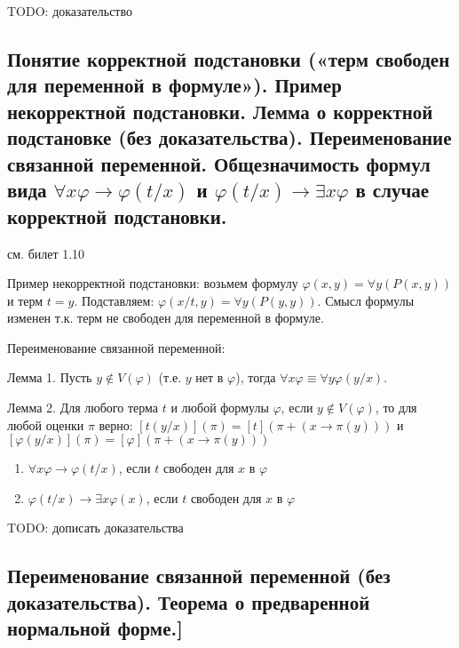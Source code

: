 \documentclass[a4paper, 10pt]{article}
\begin{document}
TODO: доказательство

\subsection{Понятие корректной подстановки («терм свободен для переменной в формуле»). Пример некорректной подстановки. Лемма о корректной подстановке (без доказательства). Переименование связанной переменной. Общезначимость формул вида $\forall x\varphi \to \varphi(t/x)$ и $\varphi(t/x) \to \exists x \varphi$ в случае корректной подстановки.}

см. билет 1.10

Пример некорректной подстановки: возьмем формулу $\varphi(x,y)=\forall y (P(x,y))$ и терм $t=y$. Подставляем: $\varphi(x/t,y)=\forall y (P(y,y))$. Смысл формулы изменен т.к. терм не свободен для переменной в формуле.

\hfill

Переименование связанной переменной:

Лемма 1. Пусть $y\not\in V(\varphi)$ (т.е. $y$ нет в $\varphi$), тогда $\forall x\varphi \equiv \forall y\varphi(y/x)$.

Лемма 2. Для любого терма $t$ и любой формулы $\varphi$, если $y \not\in V(\varphi)$, то для любой оценки $\pi$ верно: $[t(y/x)](\pi)=[t](\pi + (x \to \pi(y)))$ и $[\varphi(y/x)](\pi)=[\varphi](\pi + (x \to \pi(y)))$

\hfill

\begin{enumerate}
    \item $\forall x\varphi \to \varphi(t/x)$, если $t$ свободен для $x$ в $\varphi$
    \item $\varphi(t/x) \to \exists x \varphi(x)$, если $t$ свободен для $x$ в $\varphi$
\end{enumerate}

\hfill

TODO: дописать доказательства

\subsection{Переименование связанной переменной (без доказательства). Теорема о предваренной нормальной форме.]}
\end{document}
